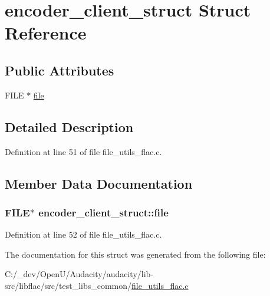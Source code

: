 \hypertarget{structencoder__client__struct}{}\section{encoder\+\_\+client\+\_\+struct Struct Reference}
\label{structencoder__client__struct}
\subsection*{Public Attributes}
\begin{DoxyCompactItemize}
\item 
F\+I\+LE $\ast$ \hyperlink{structencoder__client__struct_a129c6375cb0ed7f43aafa8b7b0bf07b6}{file}
\end{DoxyCompactItemize}


\subsection{Detailed Description}


Definition at line 51 of file file\+\_\+utils\+\_\+flac.\+c.



\subsection{Member Data Documentation}
\subsubsection[{\texorpdfstring{file}{file}}]{\setlength{\rightskip}{0pt plus 5cm}F\+I\+LE$\ast$ encoder\+\_\+client\+\_\+struct\+::file}\hypertarget{structencoder__client__struct_a129c6375cb0ed7f43aafa8b7b0bf07b6}{}\label{structencoder__client__struct_a129c6375cb0ed7f43aafa8b7b0bf07b6}


Definition at line 52 of file file\+\_\+utils\+\_\+flac.\+c.



The documentation for this struct was generated from the following file\+:\begin{DoxyCompactItemize}
\item 
C\+:/\+\_\+dev/\+Open\+U/\+Audacity/audacity/lib-\/src/libflac/src/test\+\_\+libs\+\_\+common/\hyperlink{file__utils__flac_8c}{file\+\_\+utils\+\_\+flac.\+c}\end{DoxyCompactItemize}
